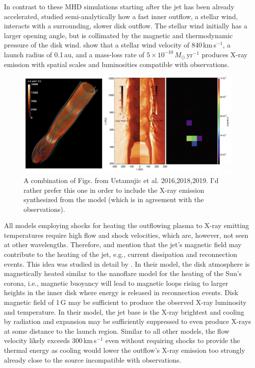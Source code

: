 In contrast to these MHD simulations starting after the jet has been already accelerated,  \citet{Guenther_2014} studied semi-analytically how a fast inner outflow, a stellar wind, interacts with a surrounding, slower disk outflow. The stellar wind initially has a larger opening angle, but is collimated by the magnetic and thermodynamic pressure of the disk wind. \citet{Guenther_2014} show that a stellar wind velocity of 840\,km\,s$^{-1}$, a launch radius of 0.1\,au, and a mass-loss rate of $5\times10^{-10}\,M_\odot$\,yr$^{-1}$ produces X-ray emission with spatial scales and luminosities compatible with observations.

\begin{figure}[t]
    \centering
    \includegraphics[width=12cm]{figs/ustamujic.png}
    \caption{A combination of Figs. from Ustamujic et al. 2016,2018,2019. I'd rather prefer this one in order to include the X-ray emission synthesized from the model (which is in agreement with the observations).}
    \label{fig:ustamujic}
\end{figure}



All models employing shocks for heating the outflowing plasma to X-ray emitting temperatures require high flow and shock velocities, which are, however, not seen at other wavelengths. Therefore, \citet{Guedel_2007} and \citet{Schneider_2013a} mention that the jet's magnetic field may contribute to the heating of the jet, e.g., current dissipation and reconnection events. This idea was studied in detail by  \citet{Takasao_2017}. In their model, 
the disk atmosphere is magnetically heated similar to the nanoflare model for the heating of the Sun's corona, i.e., magnetic buoyancy will lead to magnetic loops rising to larger heights in the inner disk where energy is released in reconnection events. Disk magnetic field of 1\,G may be sufficient to produce the observed X-ray luminosity and temperature. In their model, the jet base is the X-ray brightest and cooling by radiation and expansion may be sufficiently suppressed to even produce X-rays at some distance to the launch region. Similar to all other models, the flow velocity likely exceeds 300\,km\,s$^{-1}$ even without requiring shocks to provide the thermal energy as cooling would lower the outflow's X-ray emission too strongly already close to the source incompatible with observations.

